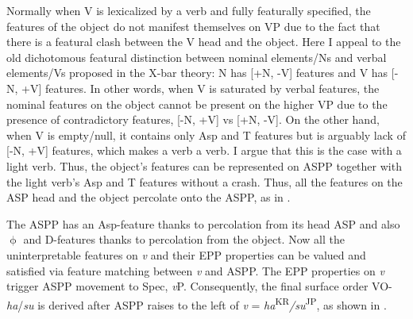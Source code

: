Normally when V is lexicalized by a verb and fully featurally specified, the features of the object do not manifest themselves on \acs{VP} due to the fact that there is a featural clash between the V head and the object. Here I appeal to the old dichotomous featural distinction between nominal elements/Ns and verbal elements/Vs proposed in the X-bar theory: N has [+N, -V] features and V has [-N, +V] features. In other words, when V is saturated by verbal features, the nominal features on the object cannot be present on the higher \acs{VP} due to the presence of contradictory features, [-N, +V] vs [+N, -V]. On the other hand, when V is empty/null, it contains only Asp and T features but is arguably lack of [-N, +V] features, which makes a verb a verb. I argue that this is the case with a light verb. Thus, the object’s features can be represented on \ac{ASP}P together with the light verb’s Asp and T features without a crash. Thus, all the features on the \ac{ASP} head and the object percolate onto the \ac{ASP}P, as in .

\ea\label{ex:120}
\z


The \ac{ASP}P has an Asp-feature thanks to percolation from its head \ac{ASP} and also $\upphi$ and D-features thanks to percolation from the object. Now all the uninterpretable features on \textit{v} and their \ac{EPP} properties can be valued and satisfied via feature matching between \textit{v} and \ac{ASP}P. The \ac{EPP} properties on \textit{v} trigger \ac{ASP}P movement to Spec, \textit{v}P. Consequently, the final surface order \ac{VO}-\textit{ha}/\textit{su} is derived after \ac{ASP}P raises to the left of \textit{v} = \textit{ha}\textsuperscript{KR}\textit{/su}\textsuperscript{JP}, as shown in . 

